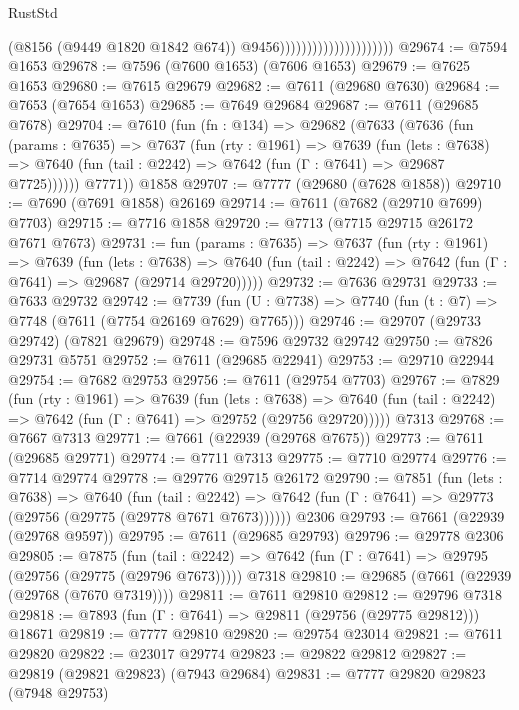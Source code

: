 \begin{lexlean}{RustStd}
\begin{coremodule}
{\begin{coremodule}
{{{{{{{{{{{{{{{{{{{{{{{{{{{{{{{{{{                                              (@8156 (@9449 @1820 @1842 @674))
                                              @9456)))))))))))))))))))))
@29674 := @7594 @1653
@29678 := @7596 (@7600 @1653) (@7606 @1653)
@29679 := @7625 @1653
@29680 := @7615 @29679
@29682 := @7611 (@29680 @7630)
@29684 := @7653 (@7654 @1653)
@29685 := @7649 @29684
@29687 := @7611 (@29685 @7678)
@29704 := @7610
    (fun (fn : @134) =>
    @29682
      (@7633
        (@7636
          (fun (params : @7635) =>
          @7637
            (fun (rty : @1961) =>
            @7639
              (fun (lets : @7638) =>
              @7640 (fun (tail : @2242) => @7642 (fun (Γ : @7641) => @29687 @7725))))))
        @7771))
    @1858
@29707 := @7777 (@29680 (@7628 @1858))
@29710 := @7690 (@7691 @1858) @26169
@29714 := @7611 (@7682 (@29710 @7699) @7703)
@29715 := @7716 @1858
@29720 := @7713 (@7715 @29715 @26172 @7671 @7673)
@29731 := fun (params : @7635) =>
  @7637
    (fun (rty : @1961) =>
    @7639
      (fun (lets : @7638) =>
      @7640 (fun (tail : @2242) => @7642 (fun (Γ : @7641) => @29687 (@29714 @29720)))))
@29732 := @7636 @29731
@29733 := @7633 @29732
@29742 := @7739
    (fun (U : @7738) => @7740 (fun (t : @7) => @7748 (@7611 (@7754 @26169 @7629) @7765)))
@29746 := @29707 (@29733 @29742) (@7821 @29679)
@29748 := @7596 @29732 @29742
@29750 := @7826 @29731 @5751
@29752 := @7611 (@29685 @22941)
@29753 := @29710 @22944
@29754 := @7682 @29753
@29756 := @7611 (@29754 @7703)
@29767 := @7829
    (fun (rty : @1961) =>
    @7639
      (fun (lets : @7638) =>
      @7640 (fun (tail : @2242) => @7642 (fun (Γ : @7641) => @29752 (@29756 @29720)))))
    @7313
@29768 := @7667 @7313
@29771 := @7661 (@22939 (@29768 @7675))
@29773 := @7611 (@29685 @29771)
@29774 := @7711 @7313
@29775 := @7710 @29774
@29776 := @7714 @29774
@29778 := @29776 @29715 @26172
@29790 := @7851
    (fun (lets : @7638) =>
    @7640
      (fun (tail : @2242) =>
      @7642 (fun (Γ : @7641) => @29773 (@29756 (@29775 (@29778 @7671 @7673))))))
    @2306
@29793 := @7661 (@22939 (@29768 @9597))
@29795 := @7611 (@29685 @29793)
@29796 := @29778 @2306
@29805 := @7875
    (fun (tail : @2242) => @7642 (fun (Γ : @7641) => @29795 (@29756 (@29775 (@29796 @7673)))))
    @7318
@29810 := @29685 (@7661 (@22939 (@29768 (@7670 @7319))))
@29811 := @7611 @29810
@29812 := @29796 @7318
@29818 := @7893 (fun (Γ : @7641) => @29811 (@29756 (@29775 @29812))) @18671
@29819 := @7777 @29810
@29820 := @29754 @23014
@29821 := @7611 @29820
@29822 := @23017 @29774
@29823 := @29822 @29812
@29827 := @29819 (@29821 @29823) (@7943 @29684)
@29831 := @7777 @29820 @29823 (@7948 @29753)
}}}}}}}}}}}}}}}}}}}}}}}}}}}}}}}}}}
\end{coremodule}}
\end{coremodule}
\end{lexlean}

